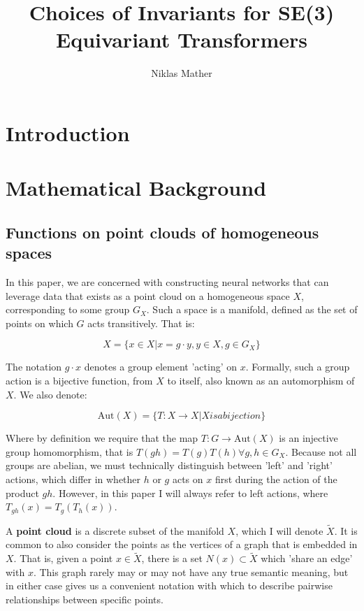 \documentclass[12pt]{article}
\begin{document}
\title{Choices of Invariants for SE(3) Equivariant Transformers}
\author{Niklas Mather}
\maketitle

\section{Introduction}

\section{Mathematical Background}
\subsection*{Functions on point clouds of homogeneous spaces}

In this paper, we are concerned with constructing neural networks that can leverage data that exists as a point cloud on a homogeneous space $X$, corresponding to some group $G_X$. Such a space is a manifold, defined as the set of points on which $G$ acts transitively. That is: 

$$ X = \{x \in X | x = g \cdot y, y \in X, g \in G_X \} $$

The notation $g \cdot x$ denotes a group element 'acting' on $x$. Formally, such a group action is a bijective function, from $X$ to itself, also known as an automorphism of $X$. We also denote:

$$ \text{Aut}(X) = \{T: X \rightarrow X | X is a bijection \}$$

Where by definition we require that the map $T: G \rightarrow \text{Aut}(X)$ is an injective group homomorphism, that is $T(gh)=T(g)T(h) \forall g, h \in G_X$. Because not all groups are abelian, we must technically distinguish between 'left' and 'right' actions, which differ in whether $h$ or $g$ acts on $x$ first during the action of the product $gh$. However, in this paper I will always refer to left actions, where $T_{gh} (x) = T_g (T_h (x))$.

A \textbf{point cloud} is a discrete subset of the manifold $X$, which I will denote $\tilde{X}$. It is common to also consider the points as the vertices of a graph that is embedded in $X$. That is, given a point $x \in  \tilde{X}$, there is a set $N(x) \subset \tilde{X}$ which 'share an edge' with $x$. This graph rarely may or may not have any true semantic meaning, but in either case gives us a convenient notation with which to describe pairwise relationships between specific points.
\end{document}
